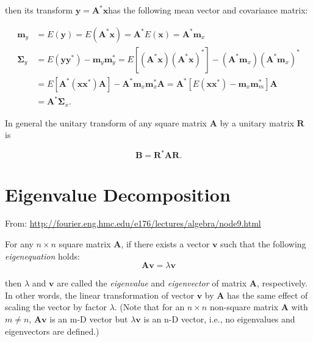 \documentclass[10pt,b5paper,titlepage]{book}
\begin{document}
\begin{itemize}
        then its transform $\mathbf{y} = \mathbf{A}^{*} \mathbf{x}$has the following
        mean vector and covariance matrix:

        \begin{equation}
            \begin{array}{ll}
                \mathbf{m}_y &= E(\mathbf{y}) = E(\mathbf{A}^{*} \mathbf{x})
                              = \mathbf{A}^{*} E(\mathbf{x}) = \mathbf{A}^{*} \mathbf{m}_x \\
                \mathbf{\Sigma}_y &= E(\mathbf{y} \mathbf{y}^{*}) - \mathbf{m}_y \mathbf{m}_y^{*}
                              = E[(\mathbf{A}^{*} \mathbf{x}) (\mathbf{A}^{*} \mathbf{x})^{*}] - (\mathbf{A}^{*} \mathbf{m}_x) (\mathbf{A}^{*} \mathbf{m}_x)^{*}\\
                             &= E[\mathbf{A}^{*} (\mathbf{x} \mathbf{x}^{*}) \mathbf{A}] - \mathbf{A}^{*} \mathbf{m}_{x} \mathbf{m}_{x}^{*} \mathbf{A}
                              = \mathbf{A}^{*} [E(\mathbf{x} \mathbf{x}^{*}) - \mathbf{m}_{x} \mathbf{m}_{m}^{*}] \mathbf{A}\\
                             &= \mathbf{A}^{*} \mathbf{\Sigma}_{x} \mathbf{}.
            \end{array}
        \end{equation}

        In general the unitary transform of any square matrix $\mathbf{A}$
        by a unitary matrix $\mathbf{R}$ is

        \begin{equation}
            \mathbf{B} = \mathbf{R}^{*} \mathbf{A} \mathbf{R} 
        .\end{equation}

\end{itemize}


\chapter{Eigenvalue Decomposition}
From: \url{http://fourier.eng.hmc.edu/e176/lectures/algebra/node9.html}

For any $n \times n$ square matrix $\mathbf{A}$, if there exists a vector $\mathbf{v}$ such that the following \textit{eigenequation} holds:
\begin{equation}
\mathbf{A}\mathbf{v}=\lambda{}\mathbf{v}
\end{equation}

then $\lambda$ and $\mathbf{v}$ are called the \textit{eigenvalue} and \textit{eigenvector}
of matrix $\mathbf{A}$, respectively. In other words, the linear transformation
of vector $\mathbf{v}$ by $\mathbf{A}$ has the same effect of scaling the vector
by factor $\lambda$. (Note that for an $ n\times n$ non-square matrix
$\mathbf{A}$ with $m \neq n$, $\mathbf{A}\mathbf{v}$ is an m-D vector but
$\lambda\mathbf{v}$ is an n-D vector, i.e., no eigenvalues and eigenvectors are defined.)
\end{document}
